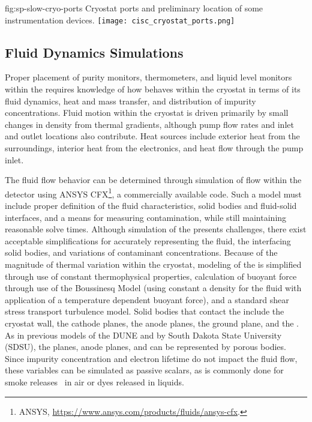 \begin{dunefigure}{fig:sp-slow-cryo-ports}
{Cryostat ports and preliminary location of some instrumentation devices. }
\texttt{[image: cisc\_cryostat\_ports.png]}
\end{dunefigure}




\subsection{Fluid Dynamics Simulations}
\label{sec:fdgen-slow-cryo-cfd}

Proper placement of purity monitors, thermometers, and liquid level monitors within the  requires knowledge of how  behaves within the cryostat in terms of its fluid dynamics, heat and mass transfer, and distribution of impurity concentrations. 
Fluid motion within the cryostat is driven primarily by small changes in density from thermal gradients, although pump flow rates and inlet and outlet locations also contribute. 
Heat sources include exterior heat from the surroundings, interior heat from the electronics, and heat flow through the pump inlet.

The fluid flow behavior can be determined through simulation of  flow within the detector using ANSYS CFX\footnote{ANSYS\texttrademark{}, \url{https://www.ansys.com/products/fluids/ansys-cfx}.}, a commercially available  code. Such a model must include proper definition of the fluid characteristics, solid bodies and fluid-solid interfaces, and a means for measuring contamination, while still maintaining reasonable solve times.
Although simulation of the  presents challenges, there exist acceptable simplifications for accurately representing the fluid, the interfacing solid bodies, and variations of contaminant concentrations. Because of the magnitude of thermal variation within the cryostat, modeling of the  is simplified through use of constant thermophysical properties, calculation of buoyant force through use of the Boussinesq Model (using constant a density for the fluid with application of a temperature dependent buoyant force), and a standard shear stress transport turbulence model. Solid bodies that contact the  include the cryostat wall, the cathode planes, the anode planes, the ground plane, and the . As in previous  models of the DUNE  and  by South Dakota State University (SDSU)\cite{docdb-5915}, the  planes, anode planes, and  can be represented by porous bodies. Since impurity concentration and electron lifetime do not impact the fluid flow, these variables can be simulated as  passive scalars, as is commonly done for smoke releases~\cite{cfd-1} in air or dyes released in liquids.

